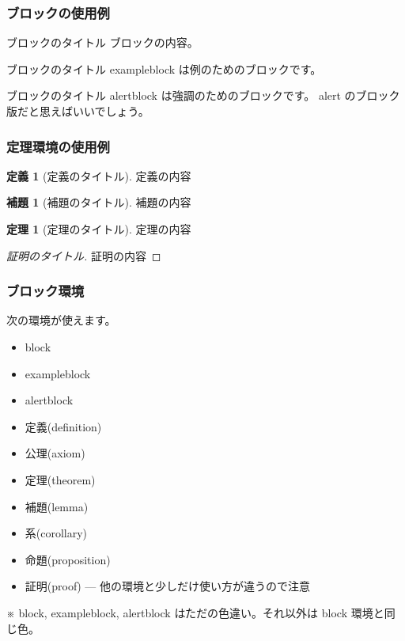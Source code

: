 \documentclass[dvipdfmx,cjk,xcolor=dvipsnames,envcountsect,notheorems,12pt]{beamer}
\theoremstyle{definition}
\newtheorem{definition}{定義}
\newtheorem{theorem}{定理}
\newtheorem{lemma}{補題}
\begin{document}
\begin{frame}
  \frametitle{ブロックの使用例}
  \begin{block}{ブロックのタイトル}
    ブロックの内容。
  \end{block}
  \vfill
  \begin{exampleblock}{ブロックのタイトル}
    exampleblock は例のためのブロックです。
  \end{exampleblock}
  \vfill
  \begin{alertblock}{ブロックのタイトル}
    alertblock は強調のためのブロックです。
    alert のブロック版だと思えばいいでしょう。
  \end{alertblock}
\end{frame}

\begin{frame}
  \frametitle{定理環境の使用例}
  \renewcommand{\thedefinition}{1.1}%
  \begin{definition}[定義のタイトル]
    定義の内容
  \end{definition}
  \vfill
  \renewcommand{\thelemma}{2.2}%
  \begin{lemma}[補題のタイトル]
    補題の内容
  \end{lemma}
  \vfill
  \renewcommand{\thetheorem}{3.4}%
  \begin{theorem}[定理のタイトル]
    定理の内容
  \end{theorem}
  \vfill
  \begin{proof}[証明のタイトル]
    証明の内容
  \end{proof}
\end{frame}

\begin{frame}
  \frametitle{ブロック環境}
  次の環境が使えます。
  \begin{itemize}
  \item block
  \item exampleblock
  \item alertblock
  \item 定義(definition)
  \item 公理(axiom)
  \item 定理(theorem)
  \item 補題(lemma)
  \item 系(corollary)
  \item 命題(proposition)
  \item 証明(proof) --- 他の環境と少しだけ使い方が違うので注意
  \end{itemize}
  ※ block, exampleblock, alertblock はただの色違い。それ以外は block 環境と同じ色。
\end{frame}
\end{document}
